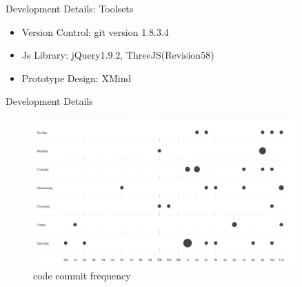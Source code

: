 \documentclass{beamer}
\begin{document}
\begin{frame}{Development Details: Toolsets}
\begin{itemize}
    \item Version Control: git version 1.8.3.4
    \item Js Library: jQuery1.9.2, ThreeJS(Revision58)
    \item Prototype Design: XMind
\end{itemize}
\end{frame}

\begin{frame}{Development Details}
\begin{center}
    \begin{figure}
        \includegraphics[width=0.9\textwidth]{./images/code_frequency.png}
        \caption{code commit frequency}
    \end{figure}
\end{center}
\end{frame}



\end{document}
